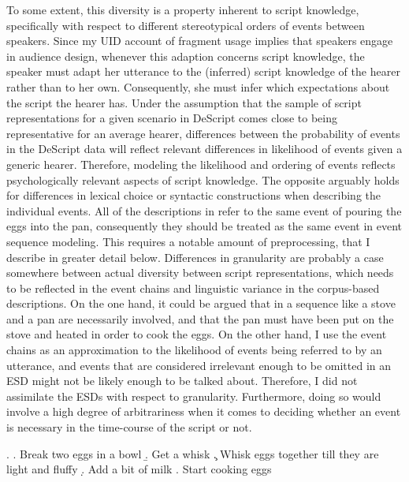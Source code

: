 To some extent, this diversity is a property inherent to script knowledge, specifically with respect to different stereotypical orders of events between speakers. Since my UID account of fragment usage implies that speakers engage in audience design, whenever this adaption concerns script knowledge, the speaker must adapt her utterance to the (inferred) script knowledge of the hearer rather than to her own. Consequently, she must infer which expectations about the script the hearer has. Under the assumption that the sample of script representations for a given scenario in DeScript comes close to being representative for an average hearer, differences between the probability of events in the DeScript data will reflect relevant differences in likelihood of events given a generic hearer. Therefore, modeling the likelihood and ordering of events reflects psychologically relevant aspects of script knowledge. The opposite arguably holds for differences in lexical choice or syntactic constructions when describing the individual events. All of the descriptions in \Last refer to the same event of pouring the eggs into the pan, consequently they should be treated as the same event in event sequence modeling. This requires a notable amount of preprocessing, that I describe in greater detail below. Differences in granularity are probably a case somewhere between actual diversity between script representations, which needs to be reflected in the event chains and linguistic variance in the corpus-based descriptions. On the one hand, it could be argued that in a sequence like \Next a stove and a pan are necessarily involved, and that the pan must have been put on the stove and heated in order to cook the eggs. On the other hand, I use the event chains as an approximation to the likelihood of events being referred to by an utterance, and events that are considered irrelevant enough to be omitted in an ESD might not be likely enough to be talked about. Therefore, I did not assimilate the ESDs with respect to granularity. Furthermore, doing so would involve a high degree of arbitrariness when it comes to deciding whether an event is necessary in the time-course of the script or not. 

\ex. \a. Break two eggs in a bowl
\b. Get a whisk
\c. Whisk eggs together till they are light and fluffy
\d. Add a bit of milk
\e. Start cooking eggs

